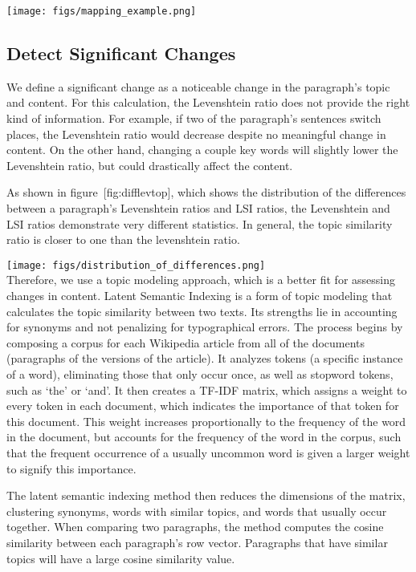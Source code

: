 \texttt{[image: figs/mapping\_example.png]}\\

\subsection{Detect Significant
Changes}\label{detect-significant-changes}

We define a significant change as a noticeable change in the paragraph's
topic and content. For this calculation, the Levenshtein ratio does not
provide the right kind of information. For example, if two of the
paragraph's sentences switch places, the Levenshtein ratio would
decrease despite no meaningful change in content. On the other hand,
changing a couple key words will slightly lower the Levenshtein ratio,
but could drastically affect the content.

As shown in figure~{[}fig:difflevtop{]}, which shows the distribution of
the differences between a paragraph's Levenshtein ratios and LSI ratios,
the Levenshtein and LSI ratios demonstrate very different statistics. In
general, the topic similarity ratio is closer to one than the
levenshtein ratio.

\texttt{[image: figs/distribution\_of\_differences.png]}\\

Therefore, we use a topic modeling approach, which is a better fit for
assessing changes in content. Latent Semantic Indexing
\cite{deerwester1990indexing} is a form of topic modeling that
calculates the topic similarity between two texts. Its strengths lie in
accounting for synonyms and not penalizing for typographical errors. The
process begins by composing a corpus for each Wikipedia article from all
of the documents (paragraphs of the versions of the article). It
analyzes tokens (a specific instance of a word), eliminating those that
only occur once, as well as stopword tokens, such as `the' or `and'. It
then creates a TF-IDF matrix, which assigns a weight to every token in
each document, which indicates the importance of that token for this
document. This weight increases proportionally to the frequency of the
word in the document, but accounts for the frequency of the word in the
corpus, such that the frequent occurrence of a usually uncommon word is
given a larger weight to signify this importance.

The latent semantic indexing method then reduces the dimensions of the
matrix, clustering synonyms, words with similar topics, and words that
usually occur together. When comparing two paragraphs, the method
computes the cosine similarity between each paragraph's row vector.
Paragraphs that have similar topics will have a large cosine similarity
value.

